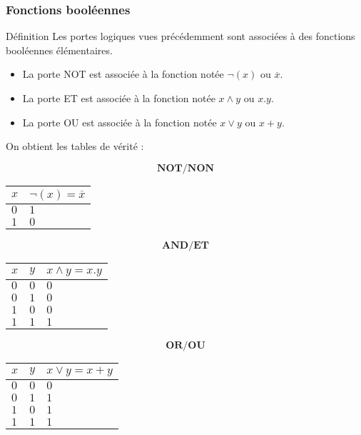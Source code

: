 \documentclass[9pt]{beamer}
\begin{document}
\begin{frame}
\frametitle{Fonctions booléennes}

\begin{block}{Définition}
Les portes logiques vues précédemment sont associées à des fonctions booléennes élémentaires.
\begin{itemize}
\item La porte NOT est associée à la fonction notée $\neg(x)$ ou $\overline{x}$.
\item La porte ET est associée à la fonction notée $x \wedge y$ ou $x.y$.
\item La porte OU est associée à la fonction notée $x \vee y$ ou $x+y$.
\end{itemize}

On obtient les tables de vérité :\medskip

\begin{minipage}[t]{3cm}
$$\textbf{NOT/NON}$$
\begin{tabular}{|C{0.4cm}|C{1.4cm}|}\hline
$x$ & $\neg(x)=\overline{x}$\\\hline
$0$ & $1$\\\hline
$1$ & $0$\\\hline
\end{tabular}
\end{minipage}\hfill
\begin{minipage}[t]{4cm}
$$\textbf{AND/ET}$$
\begin{tabular}{*{2}{|C{0.4cm}}|C{1.6cm}|}\hline
$x$ & $y$ & $x \wedge y=x.y$\\\hline
$0$ & $0$ & $0$ \\\hline
$0$ & $1$ & $0$ \\\hline
$1$ & $0$ & $0$ \\\hline
$1$ & $1$ & $1$ \\\hline
\end{tabular}
\end{minipage}\hfill
\begin{minipage}[t]{4cm}
$$\textbf{OR/OU}$$
\begin{tabular}{*{2}{|C{0.4cm}}|C{1.8cm}|}\hline
$x$ & $y$ & $x \vee y=x+y$\\\hline
$0$ & $0$ & $0$ \\\hline
$0$ & $1$ & $1$ \\\hline
$1$ & $0$ & $1$ \\\hline
$1$ & $1$ & $1$ \\\hline
\end{tabular}
\end{minipage}
\end{block}
\end{frame}
\end{document}
